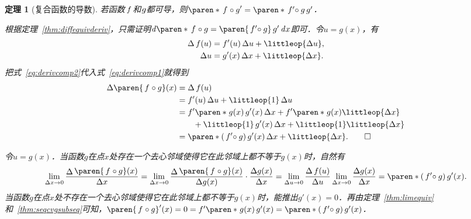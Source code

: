 \documentclass[a4paper,punct=CCT]{ctexbook}
\makeatletter
\newtheorem{theorem}{定理}
\theoremstyle{definition}
\theoremstyle{remark}
\renewcommand*{\proofname}{证}
\renewenvironment{proof}[1][\proofname]{\par
  \pushQED{\qed}%
  \normalfont \topsep6\p@\@plus6\p@\relax
  \trivlist
  \item[\hskip\labelsep
    \bfseries
    #1%
    ]\ignorespaces
}{%
  \popQED\endtrivlist\@endpefalse
}
\makeatother
\begin{document}
\begin{theorem}[复合函数的导数]
  \label{thm:derivcomp}
  若函数\(\,f\mkern2mu\)和\(\mkern1mu g\)都可导，则\(\paren*{\,f\mkern1mu \circ g}' = \paren*{\,f'\mkern-4mu \circ g}\,g'\)．

  \begin{proof}
    根据定理~\ref{thm:diffequivderiv}，只需证明\(\diff\paren*{\,f\mkern1mu \circ g} =  \paren{\,f'\mkern-4mu \circ g}\,g' \dx\)即可．令\(u = g(x)\)，有
    \begin{align}
      \fwdf\,f(u)
      &= f'(u) \fdu + \littleop{\fdu},
        \label{eq:derivcomp1} \\
      \fdu
      &= g'(x) \fdx + \littleop{\fdx}.
        \label{eq:derivcomp2}
    \end{align}
    把式~\eqref{eq:derivcomp2}代入式~\eqref{eq:derivcomp1}就得到
    \begin{equation*}
      \begin{split}
        \fwdf\paren{\,f\mkern1mu \circ g}(x)
        &= \fwdf\,f(u) \\
        &= f'(u) \fdu + \littleop{1} \fdu \\
        &= f'\paren*{\mkern1mu g(x)}\,g'(x) \fdx + f'\paren*{\mkern1mu g(x)} \littleop{\fdx} \\
        &\qquad + \littleop{1}\,g'(x) \fdx + \littleop{1} \littleop{\fdx} \\
        &= \paren*{(\,f'\mkern-4mu \circ g)\,g'}(x) \fdx + \littleop{\fdx}.
        \qedhere
      \end{split}
    \end{equation*}
  \end{proof}
  \begin{proof}
    令\(u = g(x)\)．当函数\(g\)在点\(x\)处存在一个去心邻域使得它在此邻域上都不等于\(g(x)\)时，自然有
    \begin{equation*}
      \lim_{\fdx\to0} \frac{\Fn\Delta\paren{\,f\mkern1mu \circ g}(x)}{\fdx}
      = \lim_{\fdx\to0} \frac{\Fn\Delta\paren{\,f\mkern1mu \circ g}(x)}{\fwdf g(x)}
      \cdot \frac{\fwdf g(x)}{\fdx}
      = \lim_{\fdu\to0}\frac{\fwdf\,f(u)}{\fdu} \lim_{\fdx\to0} \frac{\fwdf g(x)}{\fdx}
      = \paren*{(\,f'\mkern-4mu \circ g)\,g'}(x).
    \end{equation*}
    当函数\(g\)在点\(x\)处不存在一个去心邻域使得它在此邻域上都不等于\(g(x)\)时，能推出\(g'(x) = 0\)．再由定理~\ref{thm:limequiv}和~\ref{thm:seqcvgsubseq}可知，\(\paren{\,f\mkern1mu \circ g}'(x) = 0 = f'\paren*{\mkern1mu g(x)}\,g'(x) = \paren*{(\,f'\mkern-4mu \circ g)\,g'}(x)\)．
  \end{proof}
\end{theorem}
\end{document}
